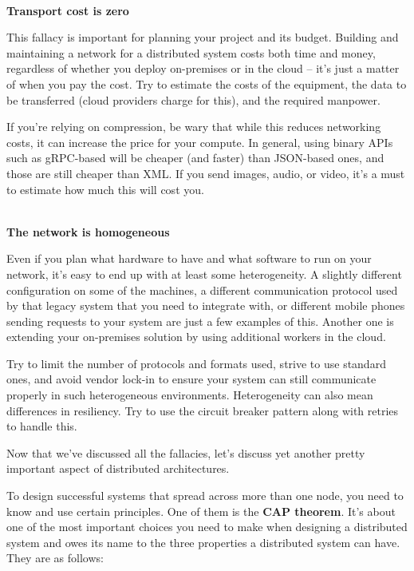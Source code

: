 \hspace*{\fill} \\ %
\noindent
\textbf{Transport cost is zero}

This fallacy is important for planning your project and its budget. Building and maintaining a network for a distributed system costs both time and money, regardless of whether you deploy on-premises or in the cloud – it's just a matter of when you pay the cost. Try to estimate the costs of the equipment, the data to be transferred (cloud providers charge for this), and the required manpower.

If you're relying on compression, be wary that while this reduces networking costs, it can increase the price for your compute. In general, using binary APIs such as gRPC-based will be cheaper (and faster) than JSON-based ones, and those are still cheaper than XML. If you send images, audio, or video, it's a must to estimate how much this will cost you.

\hspace*{\fill} \\ %
\noindent
\textbf{The network is homogeneous}

Even if you plan what hardware to have and what software to run on your network, it's easy to end up with at least some heterogeneity. A slightly different configuration on some of the machines, a different communication protocol used by that legacy system that you need to integrate with, or different mobile phones sending requests to your system are just a few examples of this. Another one is extending your on-premises solution by using additional workers in the cloud.

Try to limit the number of protocols and formats used, strive to use standard ones, and avoid vendor lock-in to ensure your system can still communicate properly in such heterogeneous environments. Heterogeneity can also mean differences in resiliency. Try to use the circuit breaker pattern along with retries to handle this.

Now that we've discussed all the fallacies, let's discuss yet another pretty important aspect of distributed architectures.


To design successful systems that spread across more than one node, you need to know and use certain principles. One of them is the \textbf{CAP theorem}. It's about one of the most important choices you need to make when designing a distributed system and owes its name to the three properties a distributed system can have. They are as follows:


